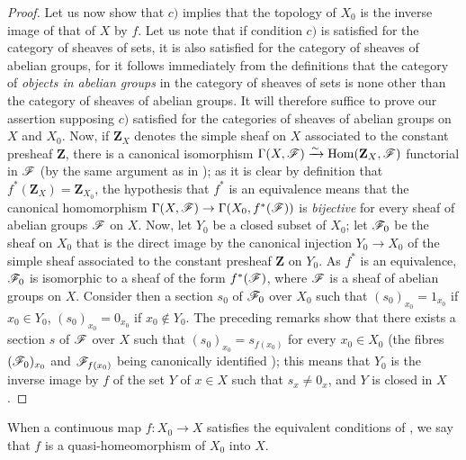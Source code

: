\begin{proof}
Let us now show that $c)$ implies that the topology of $X_0$ is the inverse image of that of $X$ by $f$.
Let us note that if condition $c)$ is satisfied for the category of sheaves of sets, it is also satisfied for the category of sheaves of abelian groups, for it follows immediately from the definitions  that the category of \emph{objects in abelian groups} in the category of sheaves of sets is none other than the category of sheaves of abelian groups.
It will therefore suffice to prove our assertion supposing $c)$ satisfied for the categories of sheaves of abelian groups on $X$ and $X_0$.
Now, if $\mathbf{Z}_X$ denotes the simple sheaf on $X$ associated to the constant presheaf $\mathbf{Z}$, there is a canonical isomorphism $\Gamma(X,\mathscr{F})\xrightarrow{\sim}\operatorname{Hom}(\mathbf{Z}_X,\mathscr{F})$ functorial in $\mathscr{F}$ (by the same argument as in ); as it is clear by definition  that $f^*(\mathbf{Z}_X)=\mathbf{Z}_{X_0}$, the hypothesis that $f^*$ is an equivalence means that the canonical homomorphism $\Gamma(X,\mathscr{F})\to\Gamma(X_0,f^*(\mathscr{F}))$ is \emph{bijective} for every sheaf of abelian groups $\mathscr{F}$ on $X$.
Now, let $Y_0$ be a closed subset of $X_0$; let $\mathscr{F}_0$ be the sheaf on $X_0$ that is the direct image by the canonical injection $Y_0\to X_0$ of the simple sheaf associated to the constant presheaf $\mathbf{Z}$ on $Y_0$.
As $f^*$ is an equivalence, $\mathscr{F}_0$ is isomorphic to a sheaf of the form $f^*(\mathscr{F})$, where $\mathscr{F}$ is a sheaf of abelian groups on $X$.
Consider then a section $s_0$ of $\mathscr{F}_0$ over $X_0$ such that $(s_0)_{x_0}=1_{x_0}$ if $x_0\in Y_0$, $(s_0)_{x_0}=0_{x_0}$ if $x_0\notin Y_0$.
The preceding remarks show that there exists a section $s$ of $\mathscr{F}$ over $X$ such that $(s_0)_{x_0}=s_{f(x_0)}$ for every $x_0\in X_0$ (the fibres $(\mathscr{F}_0)_{x_0}$ and $\mathscr{F}_{f(x_0)}$ being canonically identified ); this means that $Y_0$ is the inverse image by $f$ of the set $Y$ of $x\in X$ such that $s_x\neq 0_x$, and $Y$ is closed in $X$.
\end{proof}

\begin{definition}[10.2.2]
\label{IV.10.2.2}
When a continuous map $f:X_0\to X$ satisfies the equivalent conditions of , we say that $f$ is a quasi-homeomorphism of $X_0$ into $X$.
\end{definition}

